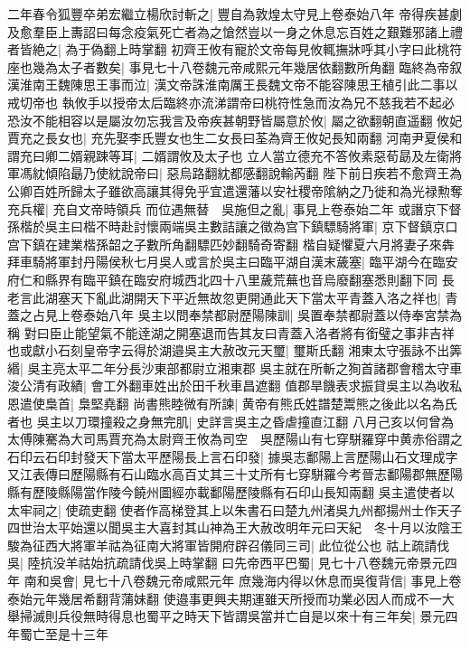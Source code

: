 二年春令狐豐卒弟宏繼立楊欣討斬之|{
	豐自為敦煌太守見上卷泰始八年}
帝得疾甚劇及愈羣臣上夀詔曰每念疫氣死亡者為之愴然豈以一身之休息忘百姓之艱難邪諸上禮者皆絶之|{
	為于偽翻上時掌翻}
初齊王攸有寵於文帝每見攸輒撫牀呼其小字曰此桃符座也幾為太子者數矣|{
	事見七十八卷魏元帝咸熙元年幾居依翻數所角翻}
臨終為帝叙漢淮南王魏陳思王事而泣|{
	漢文帝誅淮南厲王長魏文帝不能容陳思王植引此二事以戒切帝也}
執攸手以授帝太后臨終亦流涕謂帝曰桃符性急而汝為兄不慈我若不起必恐汝不能相容以是屬汝勿忘我言及帝疾甚朝野皆屬意於攸|{
	屬之欲翻朝直遥翻}
攸妃賈充之長女也|{
	充先娶李氏豐女也生二女長曰荃為齊王攸妃長知兩翻}
河南尹夏侯和謂充曰卿二婿親踈等耳|{
	二婿謂攸及太子也}
立人當立德充不答攸素惡荀勗及左衛將軍馮紞傾陷朂乃使紞說帝曰|{
	惡烏路翻紞都感翻說輸芮翻}
陛下前日疾若不愈齊王為公卿百姓所歸太子雖欲高讓其得免乎宜遣還藩以安社稷帝隂納之乃徙和為光禄勲奪充兵權|{
	充自文帝時領兵}
而位遇無替　吳施但之亂|{
	事見上卷泰始二年}
或譖京下督孫楷於吳主曰楷不時赴討懷兩端吳主數詰讓之徵為宫下鎮驃騎將軍|{
	京下督鎮京口宫下鎮在建業楷孫韶之子數所角翻驃匹妙翻騎奇寄翻}
楷自疑懼夏六月將妻子來犇拜車騎將軍封丹陽侯秋七月吳人或言於吳主曰臨平湖自漢末薉塞|{
	臨平湖今在臨安府仁和縣界有臨平鎮在臨安府城西北四十八里薉荒蕪也音烏廢翻塞悉則翻下同}
長老言此湖塞天下亂此湖開天下平近無故忽更開通此天下當太平青蓋入洛之祥也|{
	青蓋之占見上卷泰始八年}
吳主以問奉禁都尉歷陽陳訓|{
	吳置奉禁都尉蓋以侍奉宮禁為稱}
對曰臣止能望氣不能逹湖之開塞退而告其友曰青蓋入洛者將有銜璧之事非吉祥也或獻小石刻皇帝字云得於湖邉吳主大赦改元天璽|{
	璽斯氏翻}
湘東太守張詠不出筭緡|{
	吳主亮太平二年分長沙東部都尉立湘東郡}
吳主就在所斬之狥首諸郡會稽太守車浚公清有政績|{
	會工外翻車姓出於田千秋車昌遮翻}
值郡旱饑表求振貸吳主以為收私恩遣使梟首|{
	梟堅堯翻}
尚書熊睦微有所諫|{
	黄帝有熊氏姓譜楚鬻熊之後此以名為氏者也}
吳主以刀環撞殺之身無完肌|{
	史詳言吳主之昏虐撞直江翻}
八月己亥以何曾為太傅陳騫為大司馬賈充為太尉齊王攸為司空　吳歷陽山有七穿駢羅穿中黄赤俗謂之石印云石印封發天下當太平歷陽長上言石印發|{
	據吳志鄱陽上言歷陽山石文理成字又江表傳曰歷陽縣有石山臨水高百丈其三十丈所有七穿駢羅今考晉志鄱陽郡無歷陽縣有歷陵縣陽當作陵今饒州圖經亦載鄱陽歷陵縣有石印山長知兩翻}
吳主遣使者以太牢祠之|{
	使疏吏翻}
使者作高梯登其上以朱書石曰楚九州渚吳九州都揚州士作天子四世治太平始還以聞吳主大喜封其山神為王大赦改明年元曰天紀　冬十月以汝陰王駿為征西大將軍羊祜為征南大將軍皆開府辟召儀同三司|{
	此位從公也}
祜上疏請伐吳|{
	陸抗没羊祜始抗疏請伐吳上時掌翻}
曰先帝西平巴蜀|{
	見七十八卷魏元帝景元四年}
南和吳會|{
	見七十八卷魏元帝咸熙元年}
庶幾海内得以休息而吳復背信|{
	事見上卷泰始元年幾居希翻背蒲妹翻}
使邉事更興夫期運雖天所授而功業必因人而成不一大舉掃滅則兵役無時得息也蜀平之時天下皆謂吳當并亡自是以來十有三年矣|{
	景元四年蜀亡至是十三年}
